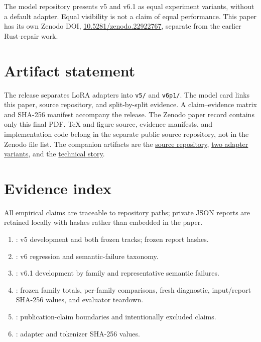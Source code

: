 \documentclass[11pt]{article}
\begin{document}
The model repository presents v5 and v6.1 as equal experiment
variants, without a default adapter. Equal visibility is not a claim of
equal performance. This paper has its own Zenodo DOI,
\href{https://doi.org/10.5281/zenodo.22922767}{10.5281/zenodo.22922767},
separate from the earlier Rust-repair work.

\section*{Artifact statement}
The release separates LoRA adapters into \texttt{v5/} and \texttt{v6p1/}.
The model card links this paper, source repository, and split-by-split
evidence. A claim--evidence matrix and SHA-256 manifest accompany the
release. The Zenodo paper record contains only this final PDF. TeX and
figure source, evidence manifests, and implementation code belong in the
separate public source repository, not in the Zenodo file list.
The companion artifacts are the \href{https://github.com/mailtotanvir/nano-agent}{source repository},
\href{https://huggingface.co/mailtotanvir/nano-agent-code-speed-1.5b}{two adapter variants},
and the \href{https://mailtotanvir.github.io/nano-agent/code-speedup-blog.html}{technical story}.

\section*{Evidence index}
All empirical claims are traceable to repository paths; private JSON reports
are retained locally with hashes rather than embedded in the paper.
\begin{enumerate}
\small\raggedright
\item {}:
  v5 development and both frozen tracks; frozen report hashes.
\item {}:
  v6 regression and semantic-failure taxonomy.
\item {}:
  v6.1 development by family and representative semantic failures.
\item {}:
  frozen family totals, per-family comparisons, fresh diagnostic, input/report
  SHA-256 values, and evaluator teardown.
\item {}:
  publication-claim boundaries and intentionally excluded claims.
\item {}:
  adapter and tokenizer SHA-256 values.
\end{enumerate}
\end{document}
